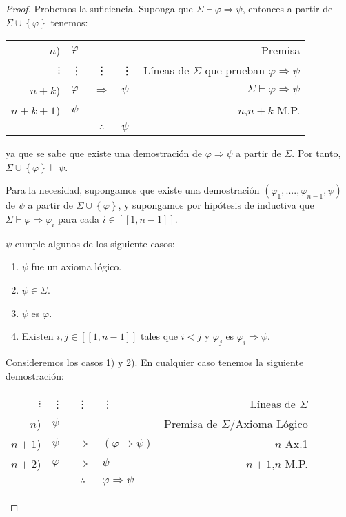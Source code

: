\documentclass[12pt]{report}
\theoremstyle{largebreak}
\newcommand\natint[1]{\ensuremath{\left[\!\left[ #1\right]\!\right]}}
\begin{document}
    \begin{proof}
        Probemos la suficiencia. Suponga que $\Sigma\vdash\varphi\Rightarrow\psi$, entonces a partir de $\Sigma\cup\left\{\varphi\right\}$ tenemos:
        \begin{center}
            \begin{tabular}{r l c l r}
                $n$) & $\varphi$ &  &  & Premisa \\
                $\vdots$ & \vdots & \vdots & \vdots & Líneas de $\Sigma$ que prueban $\varphi\Rightarrow\psi$ \\
                $n+k$) & $\varphi$ & $\Rightarrow$ & $\psi$ & $\Sigma\vdash\varphi\Rightarrow\psi$ \\
                $n+k+1$) & $\psi$ &  &  & $n$,$n+k$ M.P. \\
                \hline
                & & $\therefore$ & $\psi$ & \\
            \end{tabular}
        \end{center}
        ya que se sabe que existe una demostración de $\varphi\Rightarrow\psi$ a partir de $\Sigma$. Por tanto, $\Sigma\cup\left\{\varphi \right\}\vdash\psi$.

        Para la necesidad, supongamos que existe una demostración $(\varphi_1,....,\varphi_{n-1},\psi)$ de $\psi$ a partir de $\Sigma\cup\left\{\varphi\right\}$, y supongamos por hipótesis de inductiva que $\Sigma\vdash\varphi\Rightarrow\varphi_i$ para cada $i\in\natint{1,n-1}$.

        $\psi$ cumple algunos de los siguiente casos:
        \begin{enumerate}
            \item $\psi$ fue un axioma lógico.
            \item $\psi\in\Sigma$.
            \item $\psi$ es $\varphi$.
            \item Existen $i,j\in\natint{1,n-1}$ tales que $i<j$ y $\varphi_j$ es $\varphi_i\Rightarrow\psi$.
        \end{enumerate}

        Consideremos los casos 1) y 2). En cualquier caso tenemos la siguiente demostración:
        \begin{center}
            \begin{tabular}{r l c l r}
                $\vdots$ & \vdots & \vdots & \vdots & Líneas de $\Sigma$ \\
                $n$) & $\psi$ &  &  & Premisa de $\Sigma$/Axioma Lógico \\
                $n+1$) & $\psi$ & $\Rightarrow$ & $(\varphi\Rightarrow\psi)$ & $n$ Ax.1 \\
                $n+2$) & $\varphi$ & $\Rightarrow$ & $\psi$ & $n+1$,$n$ M.P. \\
                \hline
                & & $\therefore$ & $\varphi\Rightarrow\psi$ & \\
            \end{tabular}
        \end{center}


\end{proof}
\end{document}
